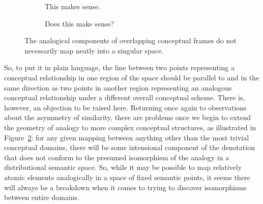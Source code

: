 \begin{figure}
  \begin{subfigure} [t] {0.5\textwidth}
  \centering
  \caption{This makes sense.}
  \label{fig:sense}
  \end{subfigure}
  \begin{subfigure} [t] {0.5\textwidth}
  \centering
  \caption{Does this make sense?}
  \label{fig:nonsense}
  \end{subfigure}
\caption[Analogies Straining Geometry]{The analogical components of overlapping conceptual frames do not necessarily map neatly into a singular space.}
\label{fig:mismatch}
\end{figure}

So, to put it in plain language, the line between two points representing a conceptual relationship in one region of the space should be parallel to and in the same direction as two points in another region representing an analogous conceptual relationship under a different overall conceptual scheme.  There is, however, an objection to be raised here.  Returning once again to  observations about the asymmetry of similarity, there are problems once we begin to extend the geometry of analogy to more complex conceptual structures, as illustrated in Figure~\ref{fig:nonsense}: for any given mapping between anything other than the most trivial conceptual domains, there will be some intensional component of the denotation that does not conform to the presumed isomorphism of the analogy in a distributional semantic space.  So, while it may be possible to map relatively atomic elements analogically in a space of fixed semantic points, it seems there will always be a breakdown when it comes to trying to discover isomorphisms between entire domains.

